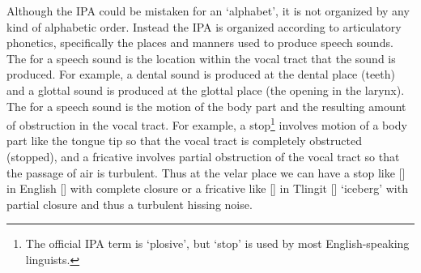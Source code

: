 Although the IPA could be mistaken for an ‘alphabet’, it is not organized by any kind of alphabetic order. Instead the IPA is organized according to articulatory phonetics, specifically the places and manners used to produce speech sounds. The  for a speech sound is the location within the vocal tract that the sound is produced. For example, a dental sound is produced at the dental place (teeth) and a glottal sound is produced at the glottal place (the opening in the larynx). The  for a speech sound is the motion of the body part and the resulting amount of obstruction in the vocal tract. For example, a stop\footnote{The official IPA term is ‘plosive’, but ‘stop’ is used by most English-speaking linguists.} involves motion of a body part like the tongue tip so that the vocal tract is completely obstructed (stopped), and a fricative involves partial obstruction of the vocal tract so that the passage of air is turbulent. Thus at the velar place we can have a stop like [] in English  [] with complete closure or a fricative like [] in Tlingit  [] ‘iceberg’ with partial closure and thus a turbulent hissing noise.

